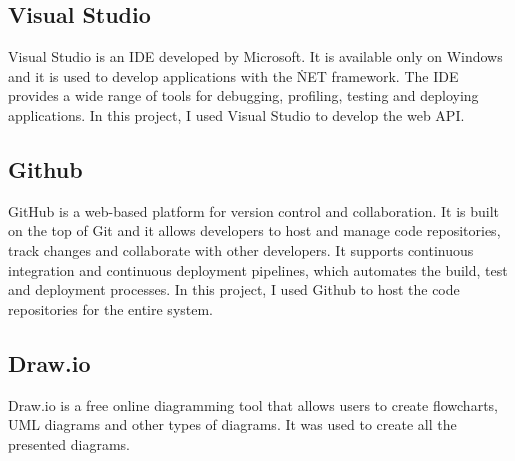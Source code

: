 \subsection{Visual Studio}
Visual Studio is an IDE developed by Microsoft. It is available only on Windows and it is used to develop applications with the \.NET framework.
The IDE provides a wide range of tools for debugging, profiling, testing and deploying applications. 
In this project, I used Visual Studio to develop the web API\cite{github_docs}.

\subsection{Github}
GitHub is a web-based platform for version control and collaboration. It is built on the top of Git and it allows developers to host and manage 
code repositories, track changes and collaborate with other developers. It supports continuous integration and continuous deployment pipelines,
which automates the build, test and deployment processes\cite{github_docs}. In this project, I used Github to host the code repositories for the entire system.

\subsection{Draw.io}
Draw.io is a free online diagramming tool that allows users to create flowcharts, UML diagrams and other types of diagrams.
It was used to create all the presented diagrams.